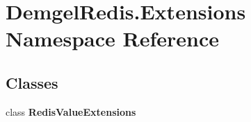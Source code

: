 \hypertarget{namespace_demgel_redis_1_1_extensions}{}\section{Demgel\+Redis.\+Extensions Namespace Reference}
\label{namespace_demgel_redis_1_1_extensions}
\subsection*{Classes}
\begin{DoxyCompactItemize}
\item 
class {\bfseries Redis\+Value\+Extensions}
\end{DoxyCompactItemize}
